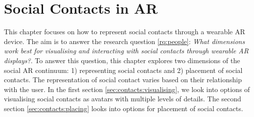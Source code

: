 \chapter{Social Contacts in AR}
\label{ch:contacts} 

This chapter focuses on how to represent social contacts through a wearable AR device. The aim is to answer the research question \ref{rq:people}: \textit{What dimensions work best for visualising and interacting with social contacts through wearable AR displays?}. To answer this question, this chapter explores two dimensions of the social AR continuum: 1) representing social contacts and 2) placement of social contacts. The representation of social contact varies based on their relationship with the user. 
In the first section \ref{sec:contacts:visualising}, we look into options of visualising social contacts as avatars with multiple levels of details. The second section \ref{sec:contacts:placing} looks into options for placement of social contacts. 





